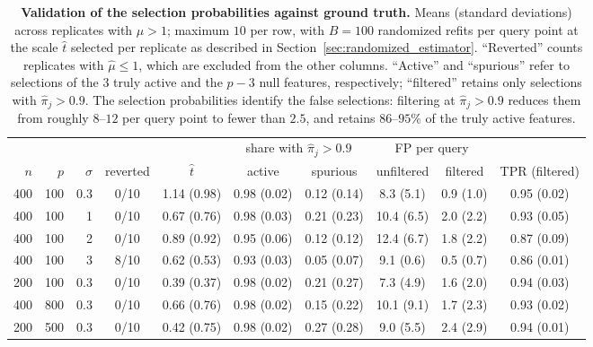 \documentclass[12pt]{article}
\theoremstyle{definition}
\begin{document}
\begin{table}[t]
\centering
\footnotesize
\begin{tabular}{rrr c c | cc | cc | c}
\toprule
&&&&& \multicolumn{2}{c|}{share with $\hat\pi_j > 0.9$}
   & \multicolumn{2}{c|}{FP per query} & \\
$n$ & $p$ & $\sigma$ & reverted & $\hat t$
  & active & spurious & unfiltered & filtered & TPR (filtered) \\
\midrule
400 & 100 & 0.3 & 0/10 & 1.14 (0.98) & 0.98 (0.02) & 0.12 (0.14) & 8.3 (5.1) & 0.9 (1.0) & 0.95 (0.02) \\
400 & 100 & 1 & 0/10 & 0.67 (0.76) & 0.98 (0.03) & 0.21 (0.23) & 10.4 (6.5) & 2.0 (2.2) & 0.93 (0.05) \\
400 & 100 & 2 & 0/10 & 0.89 (0.92) & 0.95 (0.06) & 0.12 (0.12) & 12.4 (6.7) & 1.8 (2.2) & 0.87 (0.09) \\
400 & 100 & 3 & 8/10 & 0.62 (0.53) & 0.93 (0.03) & 0.05 (0.07) & 9.1 (0.6) & 0.5 (0.7) & 0.86 (0.01) \\
200 & 100 & 0.3 & 0/10 & 0.39 (0.37) & 0.98 (0.02) & 0.21 (0.27) & 7.3 (4.9) & 1.6 (2.0) & 0.94 (0.03) \\
400 & 800 & 0.3 & 0/10 & 0.66 (0.76) & 0.98 (0.02) & 0.15 (0.22) & 10.1 (9.1) & 1.7 (2.3) & 0.93 (0.02) \\
200 & 500 & 0.3 & 0/10 & 0.42 (0.75) & 0.98 (0.02) & 0.27 (0.28) & 9.0 (5.5) & 2.4 (2.9) & 0.94 (0.01) \\
\bottomrule
\end{tabular}
\caption{\textbf{Validation of the selection probabilities against ground truth.} Means (standard deviations) across replicates with
$\hat\mu > 1$; maximum $10$ per row, with $B = 100$ randomized refits per query point at the scale $\hat t$ selected per replicate as described in Section~\ref{sec:randomized_estimator}. ``Reverted'' counts replicates with $\hat\mu \le 1$, which are excluded from the other columns. 
``Active'' and ``spurious'' refer to selections of the $3$ truly active and the $p - 3$ null features, respectively; ``filtered'' retains only selections with $\hat\pi_j > 0.9$. The selection probabilities identify the false selections: filtering at $\hat\pi_j > 0.9$ reduces them from roughly $8$--$12$ per query point to fewer than $2.5$, and retains $86$--$95\%$ of the truly active features.}
\label{tab:sim-stability}
\end{table}
\end{document}
